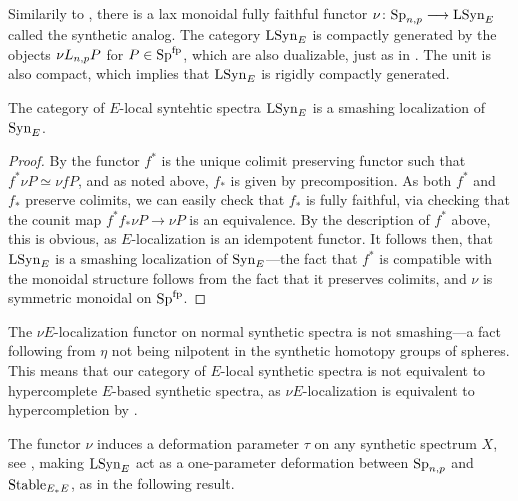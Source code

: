 Similarily to \cite[4.4, 4.38]{pstragowski_2022}, there is a lax monoidal fully faithful functor $\nu\colon\mathrm{Sp}_{n,p} \longrightarrow \mathrm{LSyn}_{E}$ called the synthetic analog. The category $\mathrm{LSyn}_{E}$ is compactly generated by the objects $\nu L_{n,p} P$ for $P\in \mathrm{Sp}^{\mathrm{fp}}$, which are also dualizable, just as in \cite[4.14]{pstragowski_2022}. The unit is also compact, which implies that $\mathrm{LSyn}_{E}$ is rigidly compactly generated. 

\begin{theorem}
    The category of $E$-local syntehtic spectra $\mathrm{LSyn}_{E}$ is a smashing localization of $\mathrm{Syn}_{E}$. 
\end{theorem}
\begin{proof}
    By \cite[2.22]{pstragowski_2022} the functor $f^*$ is the unique colimit preserving functor such that $f^* \nu P \simeq \nu f P$, and as noted above, $f_*$ is given by precomposition. As both $f^*$ and $f_*$ preserve colimits, we can easily check that $f_*$ is fully faithful, via checking that the counit map $f^*f_* \nu P \to \nu P$ is an equivalence. By the description of $f^*$ above, this is obvious, as $E$-localization is an idempotent functor. It follows then, that $\mathrm{LSyn}_{E}$ is a smashing localization of $\mathrm{Syn}_{E}$---the fact that $f^*$ is compatible with the monoidal structure follows from the fact that it preserves colimits, and $\nu$ is symmetric monoidal on $\mathrm{Sp}^{\mathrm{fp}}$. 
\end{proof}



\begin{remark}
    The $\nu E$-localization functor on normal synthetic spectra is not smashing---a fact following from $\eta$ not being nilpotent in the synthetic homotopy groups of spheres. This means that our category of $E$-local synthetic spectra is not equivalent to hypercomplete $E$-based synthetic spectra, as $\nu E$-localization is equivalent to hypercompletion by \cite[5.4]{pstragowski_2022}. 
\end{remark}

The functor $\nu$ induces a deformation parameter $\tau$ on any synthetic spectrum $X$, see \cite[Section 4.3]{pstragowski_2022}, making $\mathrm{LSyn}_{E}$ act as a one-parameter deformation between $\mathrm{Sp}_{n,p}$ and $\mathrm{Stable}_{E_*E}$, as in the following result. 

